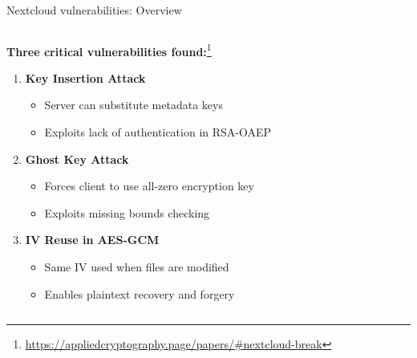 \documentclass[aspectratio=169, lualatex, handout]{beamer}
\begin{document}
\begin{frame}{Nextcloud vulnerabilities: Overview}
	\begin{columns}[c]
		\begin{column}{1\textwidth}
			\textbf{Three critical vulnerabilities found:}\footnote{\url{https://appliedcryptography.page/papers/\#nextcloud-break}}
			\begin{enumerate}
				\item \textbf{Key Insertion Attack}
				      \begin{itemize}
					      \item Server can substitute metadata keys
					      \item Exploits lack of authentication in RSA-OAEP
				      \end{itemize}
				\item \textbf{Ghost Key Attack}
				      \begin{itemize}
					      \item Forces client to use all-zero encryption key
					      \item Exploits missing bounds checking
				      \end{itemize}
				\item \textbf{IV Reuse in AES-GCM}
				      \begin{itemize}
					      \item Same IV used when files are modified
					      \item Enables plaintext recovery and forgery
				      \end{itemize}
			\end{enumerate}
		\end{column}
	\end{columns}
\end{frame}
\end{document}
